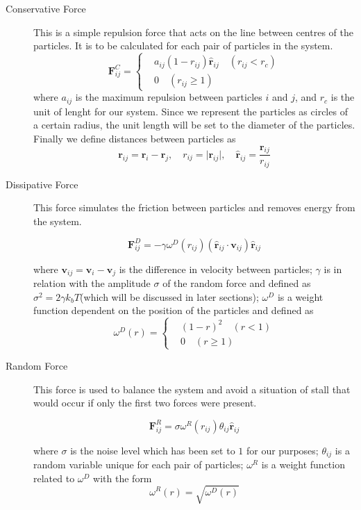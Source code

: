 \documentclass[]{usiinfbachelorproject}
\begin{document}
\begin{description}
    \item[Conservative Force] This is a simple repulsion force that acts on the line between centres of the particles. It is to be calculated 
    for each pair of particles in the system.
    \begin{equation*}
        \textbf{F}^C_{ij} = \left\{
            \begin{aligned}
              & a_{ij}(1 - r_{ij})\hat{\textbf{r}}_{ij} \quad (r_{ij} < r_c)\\
              & 0 \quad (r_{ij} \geq 1)
            \end{aligned}
          \right.
    \end{equation*}
    where $a_{ij}$ is the maximum repulsion between particles $i$ and $j$, and $r_c$ is the unit of 
    lenght for our system. Since we represent the particles as circles of a certain radius, the unit 
    length will be set to the diameter of the particles. Finally we define distances between particles as 
    $$\textbf{r}_{ij} = \textbf{r}_i - \textbf{r}_j, \quad r_{ij} = \vert \textbf{r}_{ij} \vert, \quad \hat{\textbf{r}}_{ij} = \frac{\textbf{r}_{ij}}{r_{ij}}$$
    \item[Dissipative Force] This force simulates the friction between particles and removes energy from the system.
    \item[] 
    $$\textbf{F}^D_{ij} = - \gamma \omega^D(r_{ij})(\hat{\textbf{r}}_{ij} \cdot \textbf{v}_{ij})\hat{\textbf{r}}_{ij}$$

    where $\textbf{v}_{ij} = \textbf{v}_i - \textbf{v}_j$ is the difference in velocity between particles; $\gamma$ is in relation with the amplitude 
    $\sigma$ of the random force and defined as $\sigma^2 = 2 \gamma k_b T$(which will be discussed in later sections); $\omega^D$ is a weight function 
    dependent on the position of the particles and defined as 
    \begin{equation*}
        \omega^D (r) = \left\{
            \begin{aligned}
              & (1 - r)^2 \quad (r < 1)\\
              & 0 \quad (r \geq 1)
            \end{aligned}
          \right.
    \end{equation*}
    \item[Random Force] This force is used to balance the system and avoid a situation of stall that would occur if only the 
    first two forces were present.

    $$\textbf{F}^R_{ij} = \sigma \omega^R(r_{ij})\theta_{ij}\hat{\textbf{r}}_{ij}$$

    where $\sigma$ is the noise level which has been set to $1$ for our purposes; $\theta_{ij}$ is a random variable unique for each pair of particles; 
    $\omega^R$ is a weight function related to $\omega^D$ with the form 
    $$\omega^R (r) = \sqrt {\omega^D (r)}$$

\end{description}
\end{document}
